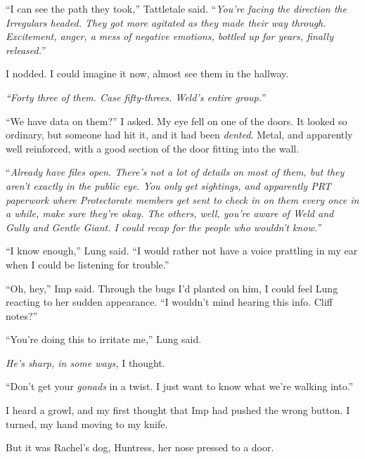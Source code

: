 ``I can see the path they took\emph{,}'' Tattletale said.  ``\emph{You're facing the direction the Irregulars headed.  They got more agitated as they made their way through.  Excitement, anger, a mess of negative emotions, bottled up for years, finally released.}''



I nodded.  I could imagine it now, almost see them in the hallway.



\emph{``Forty three of them.  Case fifty-threes.  Weld's entire group.}''



``We have data on them?'' I asked.  My eye fell on one of the doors.  It looked so ordinary, but someone had hit it, and it had been \emph{dented}.  Metal, and apparently well reinforced, with a good section of the door fitting into the wall.



``\emph{Already have files open.  There's not a lot of details on most of them, but they aren't exactly in the public eye.  You only get sightings, and apparently PRT paperwork where Protectorate members get sent to check in on them every once in a while, make sure they're okay.  The others, well, you're aware of Weld and Gully and Gentle Giant.  I could recap for the people who wouldn't know.''}



``I know enough,'' Lung said.  ``I would rather not have a voice prattling in my ear when I could be listening for trouble.''



``Oh, hey,'' Imp said.  Through the bugs I'd planted on him, I could feel Lung reacting to her sudden appearance.  ``I wouldn't mind hearing this info.  Cliff notes?''



``You're doing this to irritate me,'' Lung said.



\emph{He's sharp, in some ways,} I thought.



``Don't get your \emph{gonads} in a twist.  I just want to know what we're walking into.''



I heard a growl, and my first thought that Imp had pushed the wrong button.  I turned, my hand moving to my knife.



But it was Rachel's dog, Huntress, her nose pressed to a door.



